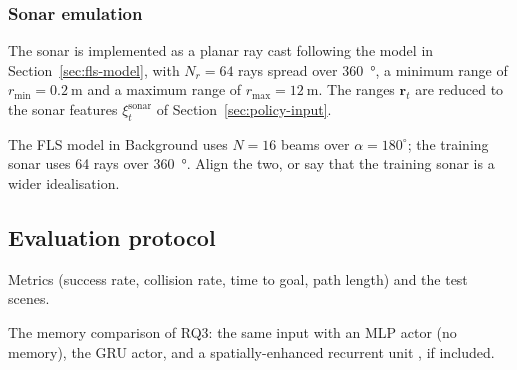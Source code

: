 \subsubsection{Sonar emulation}
\label{sec:sonar-emulation}
The sonar is implemented as a planar ray cast following the model in Section~\ref{sec:fls-model}, with $N_r = 64$ rays spread over \SI{360}{\degree}, a minimum range of $r_{\min} = \SI{0.2}{\metre}$ and a maximum range of $r_{\max} = \SI{12}{\metre}$. The ranges $\mathbf{r}_t$ are reduced to the sonar features $\xi^{\mathrm{sonar}}_t$ of Section~\ref{sec:policy-input}.

\begin{todolist}
  \item The FLS model in Background uses $N = 16$ beams over $\alpha = 180^\circ$; the training sonar uses 64 rays over \SI{360}{\degree}. Align the two, or say that the training sonar is a wider idealisation.
\end{todolist}

\subsection{Evaluation protocol}
\label{sec:evaluation}
\begin{todolist}
  \item Metrics (success rate, collision rate, time to goal, path length) and the test scenes.
  \item The memory comparison of RQ3: the same input with an MLP actor (no memory), the GRU actor, and a spatially-enhanced recurrent unit \parencite{yang2026spatially}, if included.
\end{todolist}

